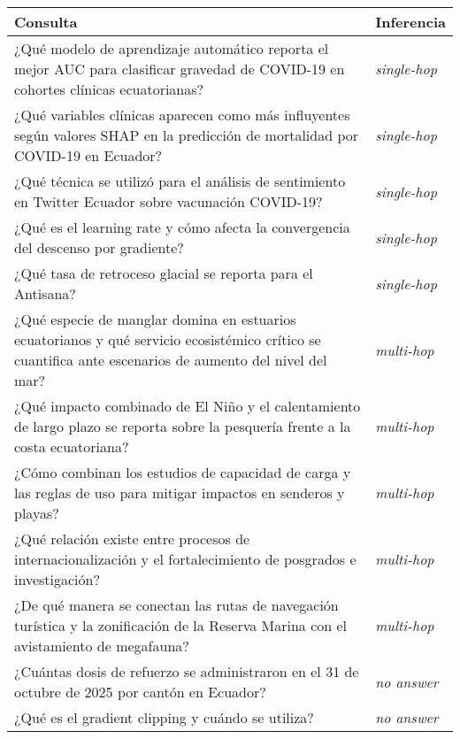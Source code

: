 \documentclass[12pt,oneside]{book}
\renewcommand{\arraystretch}{1.12}   %
\begin{document}
\begin{table}[H]
    \centering
    \renewcommand{\arraystretch}{1.15}
    \begin{tabularx}{\textwidth}{@{}X l@{}}
        \toprule
        \textbf{Consulta} & \textbf{Inferencia} \\
        \midrule
        ¿Qué modelo de aprendizaje automático reporta el mejor AUC para clasificar gravedad de COVID-19 en cohortes clínicas ecuatorianas? & \emph{single-hop} \\
        ¿Qué variables clínicas aparecen como más influyentes según valores SHAP en la predicción de mortalidad por COVID-19 en Ecuador? & \emph{single-hop} \\
        ¿Qué técnica se utilizó para el análisis de sentimiento en Twitter Ecuador sobre vacunación COVID-19? & \emph{single-hop} \\
        ¿Qué es el learning rate y cómo afecta la convergencia del descenso por gradiente? & \emph{single-hop} \\
        ¿Qué tasa de retroceso glacial se reporta para el Antisana? & \emph{single-hop} \\
        \midrule
        ¿Qué especie de manglar domina en estuarios ecuatorianos y qué servicio ecosistémico crítico se cuantifica ante escenarios de aumento del nivel del mar? & \emph{multi-hop} \\
        ¿Qué impacto combinado de El Niño y el calentamiento de largo plazo se reporta sobre la pesquería frente a la costa ecuatoriana? & \emph{multi-hop} \\
        ¿Cómo combinan los estudios de capacidad de carga y las reglas de uso para mitigar impactos en senderos y playas? & \emph{multi-hop} \\
        ¿Qué relación existe entre procesos de internacionalización  y el fortalecimiento de posgrados e investigación? & \emph{multi-hop} \\
        ¿De qué manera se conectan las rutas de navegación turística y la zonificación de la Reserva Marina con el avistamiento de megafauna? & \emph{multi-hop} \\
        \midrule
        ¿Cuántas dosis de refuerzo se administraron en el 31 de octubre de 2025 por cantón en Ecuador? & \emph{no answer} \\
        ¿Qué es el gradient clipping y cuándo se utiliza? & \emph{no answer} \\

\end{tabularx}
\end{table}
\end{document}
